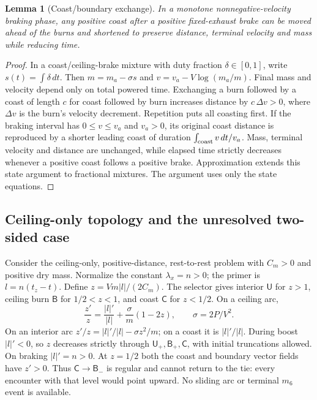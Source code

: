 \documentclass[journal,a4paper]{IEEEtran}
\newtheorem{lemma}{Lemma}
\begin{document}
\begin{lemma}[Coast/boundary exchange]
In a monotone nonnegative-velocity braking phase, any positive coast after a positive fixed-exhaust brake can be moved ahead of the burns and shortened to preserve distance, terminal velocity and mass while reducing time.
\end{lemma}
\begin{proof} In a
coast/ceiling-brake mixture with duty fraction $\delta\in[0,1]$, write
$s(t)=\int\delta\,dt$. Then $m=m_a-\sigma s$ and
$v=v_a-V\log(m_a/m)$. Final mass and velocity depend only on total
powered time. Exchanging a burn followed by a coast of length $c$ for
coast followed by burn increases distance by $c\,\Delta v>0$, where
$\Delta v$ is the burn's velocity decrement. Repetition puts all coasting
first. If the braking interval has $0\le v\le v_a$ and $v_a>0$, its
original coast distance is reproduced by a shorter leading coast of
duration $\int_{\rm coast}v\,dt/v_a$. Mass, terminal velocity and distance
are unchanged, while elapsed time strictly decreases whenever a positive
coast follows a positive brake. Approximation extends this state argument
to fractional mixtures. The argument uses only the state equations.
\end{proof}

\subsection{Ceiling-only topology and the unresolved two-sided case}
Consider the ceiling-only, positive-distance, rest-to-rest problem with
$C_m>0$ and positive dry mass. Normalize the constant $\lambda_x=n>0$;
the primer is $l=n(t_z-t)$. Define
$z=Vm|l|/(2C_m)$. The selector gives interior $\mathsf U$ for $z>1$,
ceiling burn $\mathsf B$ for $1/2<z<1$, and coast $\mathsf C$ for $z<1/2$.
On a ceiling arc,
\begin{equation}
 \frac{z'}z=\frac{|l|'}{|l|}+\frac{\sigma}{m}(1-2z),
 \qquad \sigma=2P/V^2.
\end{equation}
On an interior arc $z'/z=|l|'/|l|-\sigma z^2/m$; on a coast it is
$|l|'/|l|$. During boost $|l|'<0$, so $z$ decreases strictly through
$\mathsf U_+,\mathsf B_+,\mathsf C$, with initial truncations allowed.
On braking $|l|'=n>0$. At $z=1/2$ both the coast and boundary vector
fields have $z'>0$. Thus $\mathsf C\to\mathsf B_-$ is regular and cannot
return to the tie: every encounter with that level would point upward.
No sliding arc or terminal $m_6$ event is available.
\end{document}
